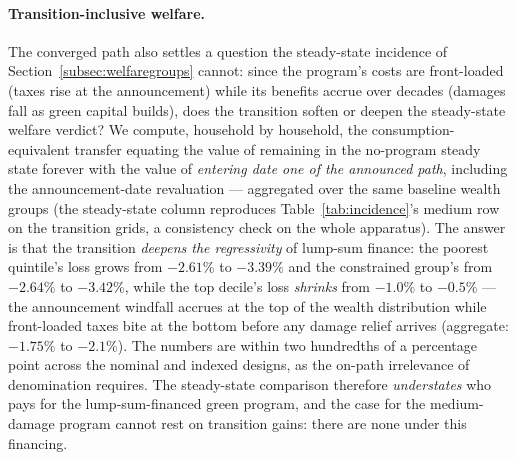 \documentclass[12pt]{article}
\begin{document}
\paragraph{Transition-inclusive welfare.} The converged path also settles
a question the steady-state incidence of Section~\ref{subsec:welfaregroups}
cannot: since the program's costs are front-loaded (taxes rise at the
announcement) while its benefits accrue over decades (damages fall as
green capital builds), does the transition soften or deepen the
steady-state welfare verdict? We compute, household by household, the
consumption-equivalent transfer equating the value of remaining in the
no-program steady state forever with the value of \emph{entering date one
of the announced path}, including the announcement-date revaluation ---
aggregated over the same baseline wealth groups (the steady-state column
reproduces Table~\ref{tab:incidence}'s medium row on the transition grids,
a consistency check on the whole apparatus). The answer is that the
transition \emph{deepens the regressivity} of lump-sum finance: the poorest
quintile's loss grows from $-2.61\%$ to $-3.39\%$ and the constrained
group's from $-2.64\%$ to $-3.42\%$, while the top decile's loss
\emph{shrinks} from $-1.0\%$ to $-0.5\%$ --- the announcement windfall
accrues at the top of the wealth distribution while front-loaded taxes
bite at the bottom before any damage relief arrives (aggregate:
$-1.75\%$ to $-2.1\%$). The numbers are within two hundredths of a
percentage point across the nominal and indexed designs, as the on-path
irrelevance of denomination requires. The steady-state comparison
therefore \emph{understates} who pays for the lump-sum-financed green
program, and the case for the medium-damage program cannot rest on
transition gains: there are none under this financing.
\end{document}
